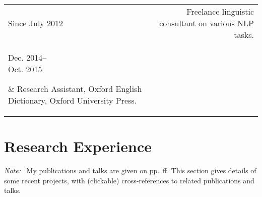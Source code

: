 \documentclass[11pt,a4paper,twoside]{article}
\makeatletter
\newcommand{\datewidth}{0.15}
\newenvironment{cvsection}{%
  \setlength{\extrarowheight}{0.70ex}
  \begin{longtable}[l]{@{} L R @{}}
}{%
  \end{longtable}
}
\newcommand{\note}{\emph{Note: }}
\makeatother
\begin{document}
\begin{cvsection}
  Since July 2012	& Freelance linguistic consultant on various NLP tasks.\\
  \parbox[t]{\datewidth\textwidth}{\raggedleft
  Dec. 2014--\\Oct. 2015}
  & Research Assistant, Oxford English Dictionary, Oxford University Press.\\
\end{cvsection}

\newpage

\section*{Research Experience}

\note\ My publications and talks are given on pp.~\pageref{scholarship}ff. This section gives details of some recent projects, with (clickable) cross-references to related publications and talks.\\
\end{document}
